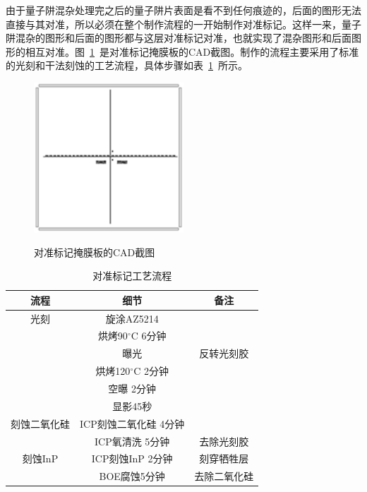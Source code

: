 \documentclass{ZJUthesis}
\begin{document}
由于量子阱混杂处理完之后的量子阱片表面是看不到任何痕迹的，后面的图形无法直接与其对准，所以必须在整个制作流程的一开始制作对准标记。这样一来，量子阱混杂的图形和后面的图形都与这层对准标记对准，也就实现了混杂图形和后面图形的相互对准。图~\ref{fig_marker}~是对准标记掩膜板的CAD截图。制作的流程主要采用了标准的光刻和干法刻蚀的工艺流程，具体步骤如表~\ref{marker}~所示。

\begin{figure}[htbp]
  \centering
  \includegraphics[width=0.5\textwidth]{./Pictures/marker.eps}\\
  \caption{对准标记掩膜板的CAD截图}
  \label{fig_marker}
\end{figure}

\begin{table}[htbp]
    \caption{对准标记工艺流程}
    \centering
    \label{marker}
    \begin{tabular}{ccc}
        \hline
        \hline
        流程 & 细节 & 备注\\
        \hline
        光刻 &旋涂AZ5214 &\\
            &烘烤90$^{\circ}$C 6分钟 &\\
            &曝光 & 反转光刻胶\\
            &烘烤120$^{\circ}$C 2分钟 &\\
            &空曝 2分钟 &\\
            &显影45秒 &\\
        \hline
        刻蚀二氧化硅 &ICP刻蚀二氧化硅 4分钟 &\\
            &ICP氧清洗 5分钟 & 去除光刻胶\\
        \hline
        刻蚀InP &ICP刻蚀InP 2分钟 &刻穿牺牲层\\
            &BOE腐蚀5分钟 &去除二氧化硅\\
        \hline
        \hline
    \end{tabular}
\end{table}
\end{document}
